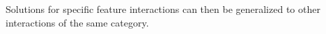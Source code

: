 Solutions for specific feature interactions can then be generalized to other interactions of the same category.